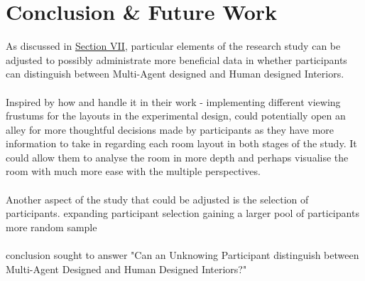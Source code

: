 \section{Conclusion \& Future Work}

As discussed in \hyperref[issues]{Section VII}, particular elements of the research study can be adjusted to possibly administrate more beneficial data in whether participants can distinguish between Multi-Agent designed and Human designed Interiors.
\\
\\
Inspired by how  \cite{constrained-layouts} and  \cite{make-it-home} handle it in their work - implementing different viewing frustums for the layouts in the experimental design, could potentially open an alley for more thoughtful decisions made by participants as they have more information to take in regarding each room layout in both stages of the study. It could allow them to analyse the room in more depth and perhaps visualise the room with much more ease with the multiple perspectives.
\\
\\
Another aspect of the study that could be adjusted is the selection of participants. 
expanding participant selection
gaining a larger pool of participants
more random sample
\\
\\
conclusion
sought to answer "Can an Unknowing Participant distinguish between Multi-Agent Designed and Human Designed Interiors?"
